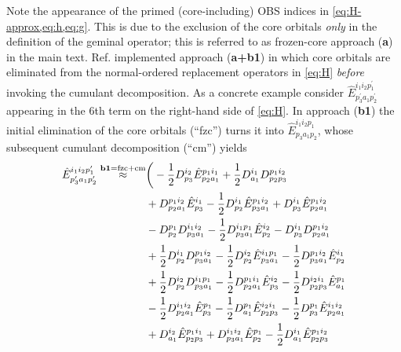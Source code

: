 \documentclass[aip,onecolumn,preprint]{revtex4-1}
\begin{document}
Note the appearance of the primed (core-including) OBS indices in \cref{eq:H-approx,eq:h,eq:g}. This is due to the exclusion of the core orbitals {\em only} in the definition of the geminal operator; this is referred to as frozen-core approach ({\bf a}) in the main text.
Ref.  implemented approach ({\bf a+b1}) in which core orbitals are eliminated from the normal-ordered replacement operators in \cref{eq:H} {\em before} invoking the cumulant decomposition. As a concrete example consider $\hat{E}_{p^{\prime}_{3}a_{1}p^{\prime}_{2}}^{i_1 i_2 p^{\prime}_1}$ appearing in the 6th term on the right-hand side of \cref{eq:H}.
In approach ({\bf b1}) the initial elimination of the core orbitals (``fzc'') turns it into $\hat{E}_{p_{3}a_{1}p_{2}}^{i_1 i_2 p_1}$, whose subsequent cumulant decomposition (``cm'') yields
 \begin{align}
 \label{eq:E3-b1}
\hat{E}_{p^{\prime}_{3}a_{1}p^{\prime}_{2}}^{i_1 i_2 p^{\prime}_1} \overset{\rm {\bf b1}=fzc+cm}{\approx}& \bigg( - {{{\frac{1}{2}}}{D^{{i_2}}_{{p_3}}}{\hat{E}^{{p_1}{i_1}}_{{p_2}{a_1}}}} + {{{\frac{1}{2}}}{D^{{i_1}}_{{a_1}}}{D^{{p_1}{i_2}}_{{p_2}{p_3}}}} \nonumber \\
  & + {{D^{{p_1}{i_2}}_{{p_2}{a_1}}}{\hat{E}^{{i_1}}_{{p_3}}}} - {{{\frac{1}{2}}}{D^{{i_1}}_{{p_2}}}{\hat{E}^{{p_1}{i_2}}_{{p_3}{a_1}}}} + {{D^{{i_1}}_{{p_3}}}{\hat{E}^{{p_1}{i_2}}_{{p_2}{a_1}}}} \nonumber \\
  & - {{D^{{p_1}}_{{p_2}}}{D^{{i_1}{i_2}}_{{p_3}{a_1}}}} - {{{\frac{1}{2}}}{D^{{i_1}{p_1}}_{{p_3}{a_1}}}{\hat{E}^{{i_2}}_{{p_2}}}} - {{D^{{i_1}}_{{p_3}}}{D^{{p_1}{i_2}}_{{p_2}{a_1}}}} \nonumber \\
  & + {{{\frac{1}{2}}}{D^{{i_1}}_{{p_2}}}{D^{{p_1}{i_2}}_{{p_3}{a_1}}}} - {{{\frac{1}{2}}}{D^{{i_2}}_{{p_2}}}{\hat{E}^{{i_1}{p_1}}_{{p_3}{a_1}}}} - {{{\frac{1}{2}}}{D^{{p_1}{i_2}}_{{p_3}{a_1}}}{\hat{E}^{{i_1}}_{{p_2}}}} \nonumber \\
  & + {{{\frac{1}{2}}}{D^{{i_2}}_{{p_2}}}{D^{{i_1}{p_1}}_{{p_3}{a_1}}}} - {{{\frac{1}{2}}}{D^{{p_1}{i_1}}_{{p_2}{a_1}}}{\hat{E}^{{i_2}}_{{p_3}}}} - {{{\frac{1}{2}}}{D^{{i_2}{i_1}}_{{p_2}{p_3}}}{\hat{E}^{{p_1}}_{{a_1}}}} \nonumber \\
  & - {{{\frac{1}{2}}}{D^{{i_1}{i_2}}_{{p_2}{a_1}}}{\hat{E}^{{p_1}}_{{p_3}}}} - {{{\frac{1}{2}}}{D^{{p_1}}_{{a_1}}}{\hat{E}^{{i_2}{i_1}}_{{p_2}{p_3}}}} - {{{\frac{1}{2}}}{D^{{p_1}}_{{p_3}}}{\hat{E}^{{i_1}{i_2}}_{{p_2}{a_1}}}} \nonumber \\
  & + {{D^{{i_2}}_{{a_1}}}{\hat{E}^{{p_1}{i_1}}_{{p_2}{p_3}}}} + {{D^{{i_1}{i_2}}_{{p_3}{a_1}}}{\hat{E}^{{p_1}}_{{p_2}}}} - {{{\frac{1}{2}}}{D^{{i_1}}_{{a_1}}}{\hat{E}^{{p_1}{i_2}}_{{p_2}{p_3}}}} \nonumber \\

\end{align}
\end{document}

